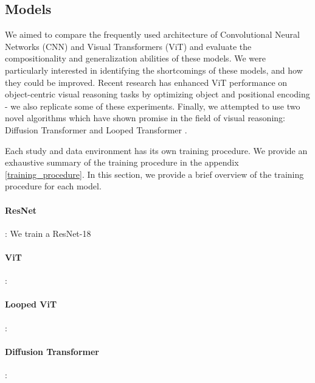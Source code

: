 \subsection{Models} \label{models}

We aimed to compare the frequently used architecture of Convolutional Neural Networks (CNN) and Visual Transformers (ViT) and evaluate the compositionality and generalization abilities of these models. We were particularly interested in identifying the shortcomings of these models, and how they could be improved. Recent research \cite{arc_vit} has enhanced ViT performance on object-centric visual reasoning tasks by optimizing object and positional encoding - we also replicate some of these experiments.
Finally, we attempted to use two novel algorithms which have shown promise in the field of visual reasoning: Diffusion Transformer \cite{diffusion_transformer} and Looped Transformer \cite{looped_transformer}.

Each study and data environment has its own training procedure. We provide an exhaustive summary of the training procedure in the appendix \ref{training_procedure}. In this section, we provide a brief overview of the training procedure for each model.

\paragraph{ResNet}: We train a ResNet-18

\paragraph{ViT}:

\paragraph{Looped ViT}:

\paragraph{Diffusion Transformer}: